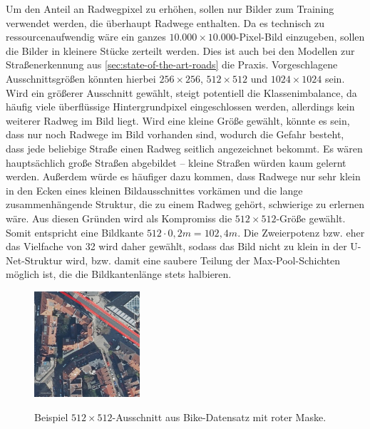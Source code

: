 Um den Anteil an Radwegpixel zu erhöhen, sollen nur Bilder zum Training verwendet werden,
die überhaupt Radwege enthalten. Da es technisch zu ressourcenaufwendig wäre ein ganzes 
$10.000 \times 10.000$-Pixel-Bild einzugeben, sollen die Bilder in kleinere Stücke zerteilt werden. 
Dies ist auch bei den Modellen zur Straßenerkennung aus \autoref{sec:state-of-the-art-roads} die Praxis. 
Vorgeschlagene Ausschnittsgrößen könnten hierbei $256\times 256$, $512\times 512$ und $1024 \times 1024$ sein. 
Wird ein größerer Ausschnitt gewählt, steigt potentiell die Klassenimbalance, da häufig viele überflüssige 
Hintergrundpixel eingeschlossen werden, allerdings kein weiterer Radweg im Bild liegt. 
Wird eine kleine Größe gewählt, könnte es sein, dass nur noch Radwege im Bild vorhanden sind, 
wodurch die Gefahr besteht, dass jede beliebige Straße einen Radweg seitlich angezeichnet bekommt. 
Es wären hauptsächlich große Straßen abgebildet -- kleine Straßen würden kaum gelernt werden. 
Außerdem würde es häufiger dazu kommen, dass Radwege nur sehr klein in den Ecken eines kleinen Bildausschnittes 
vorkämen und die lange zusammenhängende Struktur, die zu einem Radweg gehört, schwierige zu erlernen wäre. 
Aus diesen Gründen wird als Kompromiss die $512 \times 512$-Größe gewählt. Somit entspricht eine Bildkante 
$512 \cdot 0,2m = 102,4m$. Die Zweierpotenz bzw. eher das Vielfache von 32 wird daher gewählt, 
sodass das Bild nicht zu klein in der U-Net-Struktur wird, bzw. damit eine saubere Teilung der 
Max-Pool-Schichten möglich ist, die die Bildkantenlänge stets halbieren. 

\begin{figure}
	\centering
	\vspace{-30pt} %
	\includegraphics[width=0.35\textwidth]{Bilder/cut-example.jpg}
	\vspace{-10pt}
	\caption[Beispiel $512\times 512$-Ausschnitt aus Bike-Datensatz.]{\unskip}
	Beispiel $512\times 512$-Ausschnitt aus Bike-Datensatz mit roter Maske.
	\label{fig:cut-example}
\end{figure}

